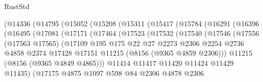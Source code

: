 \begin{lexlean}{RustStd}
\begin{coremodule}
{\begin{coremodule}
{{{{{{{{{{{{{{{{{{{{{{{{{{{{{{{{{{                (@14336
                  (@14795
                    (@15052
                      (@15208
                        (@15311
                          (@15417
                            (@15784
                              (@16291
                                (@16396
                                  (@16495
                                    (@17081
                                      (@17171
                                        (@17464
                                          (@17523
                                            (@17532
                                              (@17540
                                                (@17546
                                                  (@17556
                                                    (@17563 @17565)
                                                    (@17109
                                                      @195
                                                      @175
                                                      @22
                                                      @27
                                                      @2273
                                                      @2306
                                                      @2254
                                                      @2736
                                                      @4858
                                                      @2374
                                                      @17428
                                                      @17151
                                                      @11215
                                                      (@8156 (@9365 @4859 @2306)))
                                                    @11215
                                                    (@8156 (@9365 @4849 @4865)))
                                                  @11414
                                                  @11417
                                                  @11420
                                                  @11424
                                                  @11429
                                                  @11435)
                                                (@17175
                                                  @4875
                                                  @1097
                                                  @598
                                                  @84
                                                  @2306
                                                  @4878
                                                  @2306
}}}}}}}}}}}}}}}}}}}}}}}}}}}}}}}}}}
\end{coremodule}}
\end{coremodule}
\end{lexlean}
